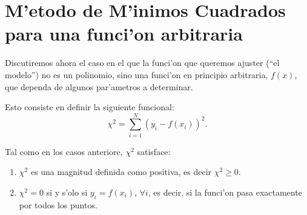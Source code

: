 \section{M'etodo de M'inimos Cuadrados para una funci'on arbitraria}
Discutiremos ahora el caso en el que la funci'on que queremos ajuster (``el modelo'') no es un polinomio, sino una funci'on en principio arbitraria, $f(x)$, que dependa de algunos par'ametros a determinar.
%
%

Esto consiste en definir la siguiente funcional: 
\begin{equation}
\chi^2=\sum_{i=1}^N\left(y_i-f(x_i)\right)^2.
\end{equation}

Tal como en los casos anteriore, $\chi^2$ satisface:
\begin{enumerate}
\item $\chi^2$ es una magnitud definida como positiva, es decir $\chi^2\geq 0$.
\item $\chi^2 = 0$ si y s'olo si $y_i = f(x_i)$, $\forall i$, es decir, si la funci'on pasa exactamente por todos los puntos.
\end{enumerate}


